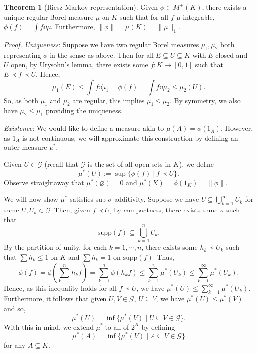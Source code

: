 \documentclass[]{article}
\theoremstyle{definition}
\newtheorem{theorem}{Theorem}
\begin{document}
\begin{theorem}[Riesz-Markov representation]
  Given \(\phi \in M^+(K)\), there exists a unique regular Borel measure \(\mu\) on \(K\) such that 
  for all \(f\) \(\mu\)-integrable, \(\phi(f) = \int f \dd\mu\). Furthermore, \(\|\phi\| = \mu(K) = \|\mu\|_1\).
\end{theorem}
\begin{proof}
  \textit{Uniqueness}: Suppose we have two regular Borel measures \(\mu_1, \mu_2\) both representing \(\phi\) 
  in the sense as above. Then for all \(E \subseteq U \subseteq K\) with \(E\) closed and \(U\) open, 
  by Urysohn's lemma, there exists some \(f : K \to [0, 1]\) such that \(E \prec f \prec U\). Hence, 
  \[\mu_1(E) \le \int f \dd \mu_1 = \phi(f) = \int f \dd\mu_2 \le \mu_2(U).\]
  So, as both \(\mu_1\) and \(\mu_2\) are regular, this implies \(\mu_1 \le \mu_2\). By symmetry, we 
  also have \(\mu_2 \le \mu_1\) providing the uniqueness.

  \textit{Existence}: We would like to define a measure akin to \(\mu(A) = \phi(1_A)\). However, 
  as \(1_A\) is not continuous, we will approximate this construction by defining an outer measure \(\mu^*\).
  
  Given \(U \in \mathcal{G}\) (recall that \(\mathcal{G}\) is the set of all open sets in \(K\)), we 
  define 
  \[\mu^*(U) := \sup \{\phi(f) \mid f \prec U\}.\]
  Observe straightaway that \(\mu^*(\varnothing) = 0\) and \(\mu^*(K) = \phi(1_K) = \|\phi\|\). 
  
  We will now show \(\mu^*\) satisfies sub-\(\sigma\)-additivity. Suppose we have \(U \subseteq \bigcup_{k = 1}^\infty U_k\) 
  for some \(U, U_k \in \mathcal{G}\). Then, given \(f \prec U\), by compactness, there exists some \(n\) 
  such that 
  \[\text{supp}(f) \subseteq \bigcup_{k = 1}^n U_k.\]
  By the partition of unity, for each \(k = 1, \cdots, n\), there exists some \(h_k \prec U_k\) such that 
  \(\sum h_k \le 1\) on \(K\) and \(\sum h_k = 1\) on \(\text{supp}(f)\). Thus, 
  \[\phi(f) = \phi\left(\sum_{k = 1}^n h_k f\right) = \sum_{k = 1}^n \phi(h_k f) 
    \le \sum_{k = 1}^n \mu^*(U_k) \le \sum_{k = 1}^\infty \mu^*(U_k).\]
  Hence, as this inequality holds for all \(f \prec U\), we have \(\mu^*(U) \le \sum_{k = 1}^\infty \mu^*(U_k)\).
  Furthermore, it follows that given \(U, V \in \mathcal{G}\), \(U \subseteq V\), we have \(\mu^*(U) \le \mu^*(V)\) 
  and so, 
  \[\mu^*(U) = \inf \{\mu^*(V) \mid U \subseteq V \in \mathcal{G}\}.\]
  With this in mind, we extend \(\mu^*\) to all of \(2^K\) by defining 
  \[\mu^*(A) = \inf \{\mu^*(V) \mid A \subseteq V \in \mathcal{G}\}\]
  for any \(A \subseteq K\).


\end{proof}
\end{document}
